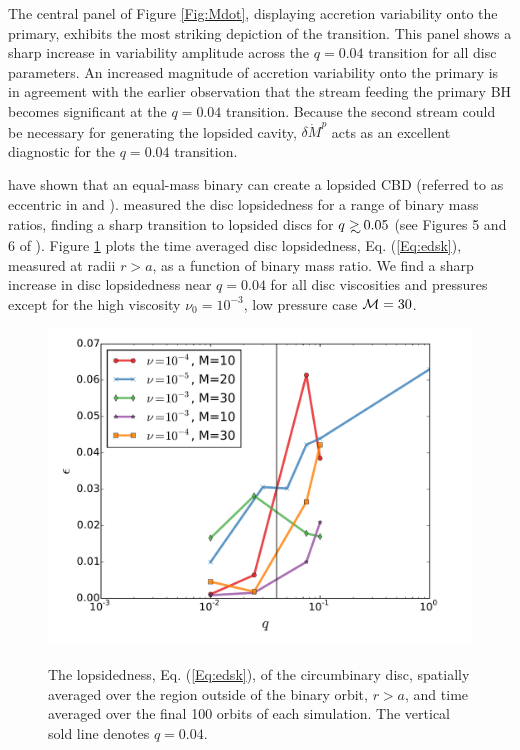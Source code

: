 The central panel of Figure \ref{Fig:Mdot}, displaying accretion
variability onto the primary, exhibits the most striking depiction of
the transition. This panel shows a sharp increase in variability
amplitude across the $q=0.04$ transition for all disc parameters. An
increased magnitude of accretion variability onto the primary is in
agreement with the earlier observation that the stream feeding the
primary BH becomes significant at the $q=0.04$ transition. Because the
second stream could be necessary for generating the lopsided cavity,
$\delta \dot{M}^p$ acts as an excellent diagnostic for the $q=0.04$
transition.




\cite{MacFadyen:2008, ShiKrolik:2012, Noble+2012, DHM:2013:MNRAS,
  Farris:2014,Farris:2015:Cool,Farris:2015:GW, ShiKrolik:2015} have
shown that an equal-mass binary can create a lopsided CBD (referred to
as eccentric in \cite{MacFadyen:2008} and
\cite{Farris:2014}). \cite{Farris:2014} measured the disc lopsidedness
for a range of binary mass ratios, finding a sharp transition to
lopsided discs for $q\gsim0.05$ (see Figures 5 and 6 of
\citealt{Farris:2014}). Figure \ref{Fig:edsk} plots the time averaged
disc lopsidedness, Eq. (\ref{Eq:edsk}), measured at radii $r>a$, as a
function of binary mass ratio. We find a sharp increase in disc
lopsidedness near $q=0.04$ for all disc viscosities and pressures
except for the high viscosity $\nu_0=10^{-3}$, low pressure case
$\mathcal{M}=30$.


\begin{figure}
\begin{center}
\includegraphics[scale=0.4]{figures/ch2/edsk1_100.pdf} \\
\end{center}
\caption{The lopsidedness, Eq. (\ref{Eq:edsk}), of the circumbinary
  disc, spatially averaged over the region outside of the binary
  orbit, $r>a$, and time averaged over the final 100 orbits of each
  simulation. The vertical sold line denotes $q=0.04$.}
\label{Fig:edsk}
\end{figure}

